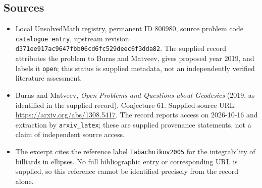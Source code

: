 \documentclass[11pt]{article}
\begin{document}
\subsection{Sources}
\begin{itemize}
\item Local UnsolvedMath registry, permanent ID \(800980\), source problem code \texttt{catalogue entry}, upstream revision \texttt{d371ee917ac9647fbb06cd6fc529deec6f3dda82}. The supplied record attributes the problem to Burns and Matveev, gives proposed year 2019, and labels it \texttt{open}; this status is supplied metadata, not an independently verified literature assessment.
\item Burns and Matveev, \emph{Open Problems and Questions about Geodesics} (2019, as identified in the supplied record), Conjecture 61. Supplied source URL: \url{https://arxiv.org/abs/1308.5417}. The record reports access on 2026-10-16 and extraction by \texttt{arxiv\_latex}; these are supplied provenance statements, not a claim of independent source access.
\item The excerpt cites the reference label \texttt{Tabachnikov2005} for the integrability of billiards in ellipses. No full bibliographic entry or corresponding URL is supplied, so this reference cannot be identified precisely from the record alone.
\end{itemize}
\end{document}
